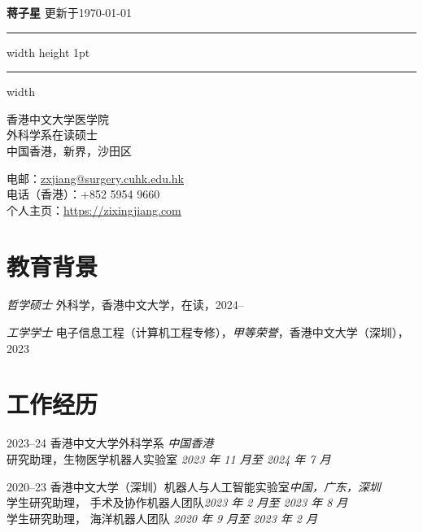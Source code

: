 \documentclass[utf8, 11pt,letterpaper]{report}
\newcommand{\myname}{蒋子星}
\newcommand{\namefont}[1]{{\normalfont\bfseries\LARGE{#1}}}
\begin{document}
\raggedright{}
	
\namefont{\myname} \hfill 更新于\monthyeardate\today
\vspace{0.5em}
\hrule width \hsize height 1pt \kern 1mm \hrule width \hsize 
\vspace{1em}
\begin{minipage}[t]{0.600\textwidth}
	香港中文大学医学院\\
	外科学系在读硕士\\
	中国香港，新界，沙田区
\end{minipage}
\hfil
\begin{minipage}[t]{0.395\textwidth}
	\flushright{}
	电邮：\href{mailto:zxjiang@surgery.cuhk.edu.hk}{zxjiang@surgery.cuhk.edu.hk} \\
	电话（香港）：+852 5954 9660 \\
	个人主页：\href{https://zixingjiang.com}{https://zixingjiang.com}\\
\end{minipage}
	
\section*{教育背景}
\begin{tablist}
	\item[\textit{哲学硕士}]  \tab{}外科学，香港中文大学，在读，2024--\\
	\item[\textit{工学学士}]  \tab{}电子信息工程（计算机工程专修），\textit{甲等荣誉}，香港中文大学（深圳），2023\\
\end{tablist}
	

\section*{工作经历}
	
\begin{tablist}
	\item[2023--24]   \tab{}香港中文大学外科学系 \hfill \textit{中国香港}\\
	研究助理，生物医学机器人实验室 \hfill \emph{\emph{2023} 年 \emph{11} 月至 \emph{2024} 年 \emph{7}  月}
		
	\item[2020--23]   \tab{}香港中文大学（深圳）机器人与人工智能实验室\hfill \textit{中国，广东，深圳}\\
	学生研究助理， 手术及协作机器人团队\hfill \emph{\emph{2023} 年 \emph{2} 月至 \emph{2023} 年 \emph{8}  月}\\
学生研究助理， 海洋机器人团队 \hfill \emph{\emph{2020} 年 \emph{9} 月至 \emph{2023} 年 \emph{2}  月}
\end{tablist}
	
\end{document}
